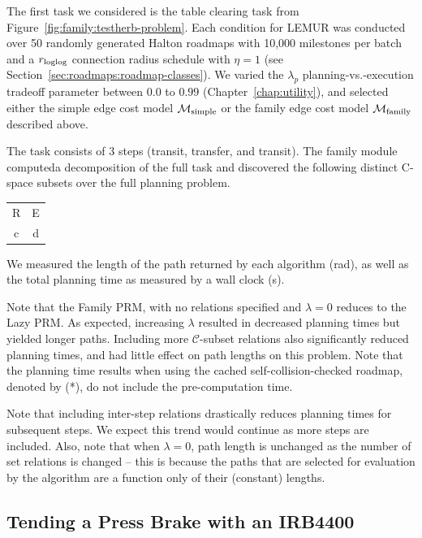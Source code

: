 The first task we considered is the table clearing task from
Figure~\ref{fig:family:testherb-problem}.
Each condition for LEMUR was conducted over 50 randomly generated
Halton roadmaps with 10,000 milestones per batch
and a $r_{\mbox{\scriptsize loglog}}$ connection radius schedule with $\eta = 1$
(see Section~\ref{sec:roadmaps:roadmap-classes}).
We varied the $\lambda_p$ planning-vs.-execution tradeoff parameter
between $0.0$ to $0.99$ (Chapter~\ref{chap:utility}),
and selected either
the simple edge cost model $\mathcal{M}_{\mbox{\scriptsize simple}}$
or the family edge cost model $\mathcal{M}_{\mbox{\scriptsize family}}$
described above.

The task consists of 3 steps (transit, transfer, and transit).
The family module computeda decomposition of the full task
and discovered the following distinct C-space subsets
over the full planning problem.
\begin{table}
   \centering
   \begin{tabular}{cc}
      R & E \\
      c & d \\
   \end{tabular}
\end{table}

We measured the length of the path returned by each algorithm (rad),
as well as the total planning time as measured by a wall clock (s).





Note that the Family PRM,
with no relations specified and $\lambda=0$
reduces to the Lazy PRM.
As expected,
increasing $\lambda$ resulted in decreased planning times
but yielded longer paths.
Including more $\mathcal{C}$-subset relations
also significantly reduced planning times,
and had little effect on path lengths on this problem.
Note that the planning time results when using
the cached self-collision-checked roadmap, denoted by (*),
do not include the pre-computation time.

Note that including inter-step relations drastically
reduces planning times for subsequent steps.
We expect this trend would continue as more steps are included.
Also, note that when $\lambda=0$,
path length is unchanged as the number of set relations is
changed
-- this is because the paths that are selected for evaluation
by the algorithm are a function only of their (constant) lengths.


\subsection{Tending a Press Brake with an IRB4400}

